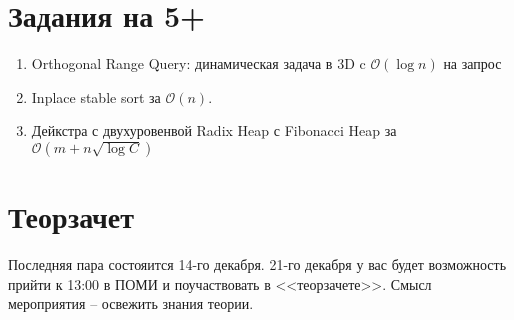 \documentclass[12pt]{article}
\def\O{\mathcal{O}}
\newenvironment{MyList}{
  \begin{enumerate}
  \setlength{\parskip}{-5pt}
  \setlength{\itemsep}{5pt}
}{
  \vspace*{-1em}
  \end{enumerate}
}
\newcommand\Section[1]{\vspace*{-1em}\section{#1}}
\begin{document}
\Section{Задания на 5+}
\begin{MyList}
\item Orthogonal Range Query: динамическая задача в 3D c $\O(\log n)$ на запрос
\item Inplace stable sort за $\O(n)$.
\item Дейкстра с двухуровенвой Radix Heap с Fibonacci Heap за $\O(m + n\sqrt{\log C})$
\end{MyList}

\Section{Теорзачет}

Последняя пара состояится 14-го декабря.
21-го декабря у вас будет возможность прийти к
13:00 в ПОМИ и поучаствовать в <<теорзачете>>.
Смысл мероприятия -- освежить знания теории.
\end{document}
